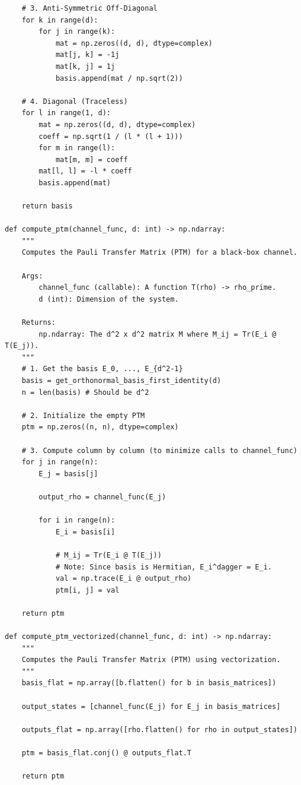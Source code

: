 \begin{lstlisting}
    # 3. Anti-Symmetric Off-Diagonal
    for k in range(d):
        for j in range(k):
            mat = np.zeros((d, d), dtype=complex)
            mat[j, k] = -1j
            mat[k, j] = 1j
            basis.append(mat / np.sqrt(2))
            
    # 4. Diagonal (Traceless)
    for l in range(1, d):
        mat = np.zeros((d, d), dtype=complex)
        coeff = np.sqrt(1 / (l * (l + 1)))
        for m in range(l):
            mat[m, m] = coeff
        mat[l, l] = -l * coeff
        basis.append(mat)
        
    return basis

def compute_ptm(channel_func, d: int) -> np.ndarray:
    """
    Computes the Pauli Transfer Matrix (PTM) for a black-box channel.
    
    Args:
        channel_func (callable): A function T(rho) -> rho_prime.
        d (int): Dimension of the system.
        
    Returns:
        np.ndarray: The d^2 x d^2 matrix M where M_ij = Tr(E_i @ T(E_j)).
    """
    # 1. Get the basis E_0, ..., E_{d^2-1}
    basis = get_orthonormal_basis_first_identity(d)
    n = len(basis) # Should be d^2
    
    # 2. Initialize the empty PTM
    ptm = np.zeros((n, n), dtype=complex)
    
    # 3. Compute column by column (to minimize calls to channel_func)
    for j in range(n):
        E_j = basis[j]
        
        output_rho = channel_func(E_j)
        
        for i in range(n):
            E_i = basis[i]
            
            # M_ij = Tr(E_i @ T(E_j))
            # Note: Since basis is Hermitian, E_i^dagger = E_i.
            val = np.trace(E_i @ output_rho)
            ptm[i, j] = val
            
    return ptm

def compute_ptm_vectorized(channel_func, d: int) -> np.ndarray:
    """
    Computes the Pauli Transfer Matrix (PTM) using vectorization.
    """
    basis_flat = np.array([b.flatten() for b in basis_matrices])

    output_states = [channel_func(E_j) for E_j in basis_matrices]

    outputs_flat = np.array([rho.flatten() for rho in output_states])

    ptm = basis_flat.conj() @ outputs_flat.T
    
    return ptm


\end{lstlisting}
